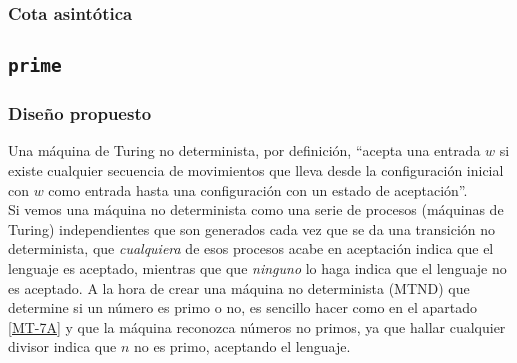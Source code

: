 





\subsubsection*{Cota asintótica}




\subsection{\texttt{prime}}

\subsubsection*{Diseño propuesto}
Una máquina de Turing no determinista, por definición, ``acepta una
entrada $w$ si existe cualquier secuencia de movimientos que lleva desde la configuración inicial con $w$ como entrada hasta una configuración con un estado de aceptación''.\\  %
Si vemos una máquina no determinista como una serie de procesos (máquinas de Turing) independientes que son generados cada vez que se da una transición no determinista, que \textit{cualquiera} de esos procesos acabe en aceptación indica que el lenguaje es aceptado, mientras que que \textit{ninguno} lo haga indica que el lenguaje no es aceptado. A la hora de crear una máquina no determinista (MTND) que determine si un número es primo o no, es sencillo hacer como en el apartado \ref{MT-7A} y que la máquina reconozca números no primos, ya que hallar cualquier divisor indica que $n$ no es primo, aceptando el lenguaje.\medskip

